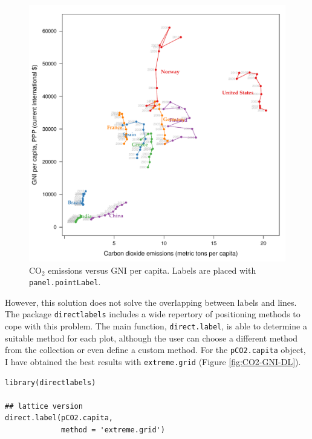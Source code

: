 \documentclass[smallroyalvopaper]{memoir}
\begin{document}
\begin{figure}[htbp]
\centering
\includegraphics[width=.9\linewidth]{figs/CO2_capita.pdf}
\caption{\(\mathrm{CO_2}\) emissions versus GNI per capita. Labels are placed with \texttt{panel.pointLabel}. \label{fig:CO2-GNI-glayer}}
\end{figure}

However, this solution does not solve the overlapping between labels
and lines. The package \texttt{directlabels} \cite{Hocking2013} includes a
wide repertory of positioning methods to cope with this problem. The
main function, \texttt{direct.label}, is able to determine a suitable method
for each plot, although the user can choose a different method from
the collection or even define a custom method. For the \texttt{pCO2.capita}
object, I have obtained the best results with \texttt{extreme.grid} (Figure
\ref{fig:CO2-GNI-DL}).


\lstset{language=r,label= ,caption= ,captionpos=b,numbers=none}
\begin{lstlisting}
library(directlabels)

## lattice version
direct.label(pCO2.capita,
             method = 'extreme.grid')
\end{lstlisting}
\end{document}

